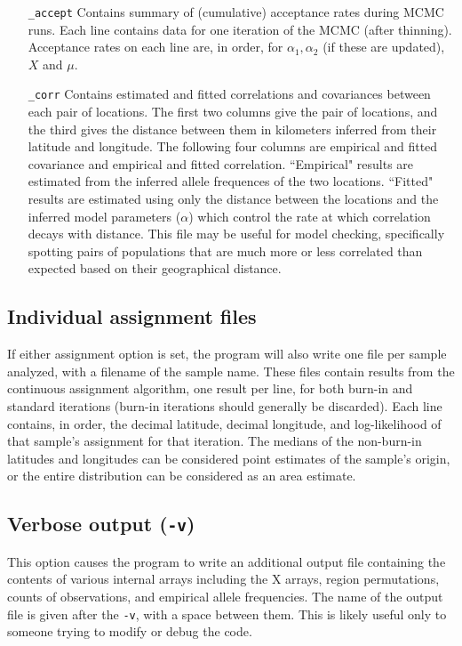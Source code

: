 \documentclass[10pt,titlepage,times,letterpaper]{article}
\begin{document}
\begin{enumerate}[\_params]
\item[{\tt \_accept}] Contains summary of (cumulative) acceptance rates
during MCMC runs. Each line contains data for one iteration of the
MCMC (after thinning). Acceptance rates on each line are, in order,
for $\alpha_1,\alpha_2$ (if these are updated), $X$ and $\mu$.
\item[{\tt \_corr}] Contains estimated and fitted correlations
and covariances between each pair of locations.  The first two columns
give the pair of locations, and the third gives the distance between them
in kilometers inferred from their latitude and longitude.  The following
four columns are empirical and fitted covariance and empirical and
fitted correlation.  ``Empirical" results are estimated from the inferred
allele frequences of the two locations.  ``Fitted" results are estimated
using only the distance between the locations and the inferred model
parameters ($\alpha$) which control the rate at which correlation decays
with distance.  This file may be useful for model checking, specifically
spotting pairs of populations that are much more or less correlated than
expected based on their geographical distance.
\end{enumerate}

\subsection{Individual assignment files}

If either assignment option is set, the program will also write one file
per sample analyzed, with a filename of the sample name.  These files
contain results from the continuous assignment algorithm, one result per
line, for both burn-in and standard iterations (burn-in iterations should
generally be discarded).  Each line contains, in order, the decimal
latitude, decimal longitude, and log-likelihood of that sample's assignment
for that iteration.  The medians of the non-burn-in latitudes and longitudes
can be considered point estimates of the sample's origin, or the
entire distribution can be considered as an area estimate.

\subsection{Verbose output ({\tt -v})}

This option causes the program to write an additional output file
containing the contents of various internal arrays including the
X arrays, region permutations, counts of observations, 
and empirical allele frequencies.  The name of the output file
is given after the {\tt -v}, with a space between them.  This is likely 
useful only to someone trying to modify or debug the code.
\end{document}
